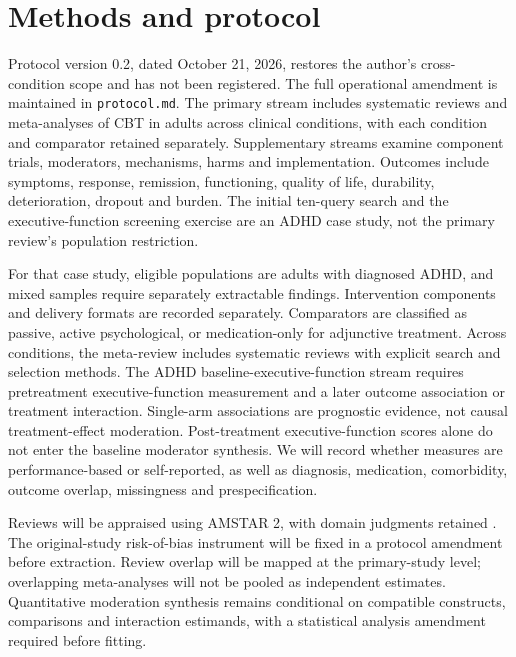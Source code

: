 \section{Methods and protocol}
\label{sec:methods}
Protocol version 0.2, dated October 21, 2026, restores the author's cross-condition scope and has not been registered.
The full operational amendment is maintained in \texttt{protocol.md}.
The primary stream includes systematic reviews and meta-analyses of CBT in adults across clinical conditions, with each condition and comparator retained separately.
Supplementary streams examine component trials, moderators, mechanisms, harms and implementation.
Outcomes include symptoms, response, remission, functioning, quality of life, durability, deterioration, dropout and burden.
The initial ten-query search and the executive-function screening exercise are an ADHD case study, not the primary review's population restriction.

For that case study, eligible populations are adults with diagnosed ADHD, and mixed samples require separately extractable findings.
Intervention components and delivery formats are recorded separately.
Comparators are classified as passive, active psychological, or medication-only for adjunctive treatment.
Across conditions, the meta-review includes systematic reviews with explicit search and selection methods.
The ADHD baseline-executive-function stream requires pretreatment executive-function measurement and a later outcome association or treatment interaction.
Single-arm associations are prognostic evidence, not causal treatment-effect moderation.
Post-treatment executive-function scores alone do not enter the baseline moderator synthesis.
We will record whether measures are performance-based or self-reported, as well as diagnosis, medication, comorbidity, outcome overlap, missingness and prespecification.

Reviews will be appraised using AMSTAR 2, with domain judgments retained \citep{Shea2017}.
The original-study risk-of-bias instrument will be fixed in a protocol amendment before extraction.
Review overlap will be mapped at the primary-study level; overlapping meta-analyses will not be pooled as independent estimates.
Quantitative moderation synthesis remains conditional on compatible constructs, comparisons and interaction estimands, with a statistical analysis amendment required before fitting.
